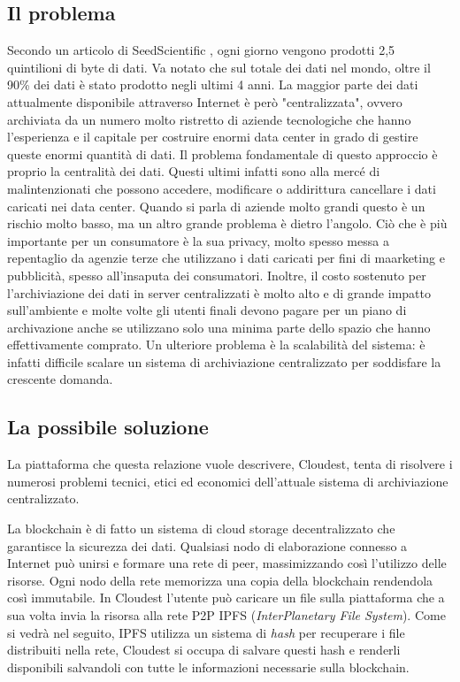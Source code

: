 \documentclass{article}
\begin{document}
\subsection{Il problema}
Secondo un articolo di SeedScientific \cite{seed_scientific_article}, ogni giorno vengono prodotti 2,5 quintilioni di byte di dati. Va notato che sul totale dei dati nel mondo, oltre il 90\% dei dati è stato prodotto negli ultimi 4 anni. La maggior parte dei dati attualmente disponibile attraverso Internet è però "centralizzata", ovvero archiviata da un numero molto ristretto di aziende tecnologiche che hanno l'esperienza e il capitale per costruire enormi data center in grado di gestire queste enormi quantità di dati. Il problema fondamentale di questo approccio è proprio la centralità dei dati. Questi ultimi infatti sono alla mercé di malintenzionati che possono accedere, modificare o addirittura cancellare i dati caricati nei data center. Quando si parla di aziende molto grandi questo è un rischio molto basso, ma un altro grande problema è dietro l'angolo. Ciò che è più importante per un consumatore è la sua privacy, molto spesso messa a repentaglio da agenzie terze che utilizzano i dati caricati per fini di maarketing e pubblicità, spesso all'insaputa dei consumatori. Inoltre, il costo sostenuto per l'archiviazione dei dati in server centralizzati è molto alto e di grande impatto sull'ambiente e molte volte gli utenti finali devono pagare per un piano di archivazione anche se utilizzano solo una minima parte dello spazio che hanno effettivamente comprato. Un ulteriore problema è la scalabilità del sistema: è infatti difficile scalare un sistema di archiviazione centralizzato per soddisfare la crescente domanda.

\subsection{La possibile soluzione}
La piattaforma che questa relazione vuole descrivere, Cloudest, tenta di risolvere i numerosi problemi tecnici, etici ed economici dell'attuale sistema di archiviazione centralizzato. 

La blockchain è di fatto un sistema di cloud storage decentralizzato che garantisce la sicurezza dei dati. Qualsiasi nodo di elaborazione connesso a Internet può unirsi e formare una rete di peer, massimizzando così l'utilizzo delle risorse. Ogni nodo della rete memorizza una copia della blockchain rendendola così immutabile. In Cloudest l'utente può caricare un file sulla piattaforma che a sua volta invia la risorsa alla rete P2P IPFS (\textit{InterPlanetary File System}). Come si vedrà nel seguito, IPFS utilizza un sistema di \textit{hash} per recuperare i file distribuiti nella rete, Cloudest si occupa di salvare questi hash e renderli disponibili salvandoli con tutte le informazioni necessarie sulla blockchain.
\end{document}

